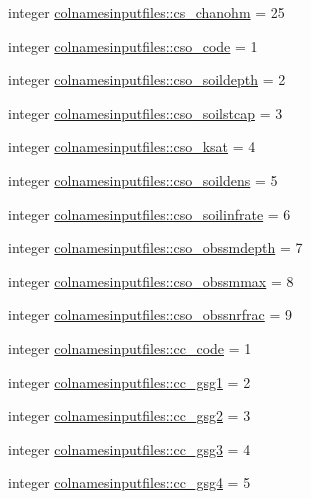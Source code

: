 \begin{DoxyCompactItemize}
\item 
integer \hyperlink{namespacecolnamesinputfiles_a002123e1a4d6e3102987980f56dacdd9}{colnamesinputfiles\+::cs\+\_\+chanohm} = 25
\item 
integer \hyperlink{namespacecolnamesinputfiles_a750911cb1a69d2d28f3b97ca1e8d40af}{colnamesinputfiles\+::cso\+\_\+code} = 1
\item 
integer \hyperlink{namespacecolnamesinputfiles_a8f92572bd1ed479f68b9c79308114583}{colnamesinputfiles\+::cso\+\_\+soildepth} = 2
\item 
integer \hyperlink{namespacecolnamesinputfiles_a762c09efd81c2a0789867996f250d528}{colnamesinputfiles\+::cso\+\_\+soilstcap} = 3
\item 
integer \hyperlink{namespacecolnamesinputfiles_abc296ff8b879ee72ed27a26ba0e2a402}{colnamesinputfiles\+::cso\+\_\+ksat} = 4
\item 
integer \hyperlink{namespacecolnamesinputfiles_aabee2fa19a7eb7a83e16ea233911bad0}{colnamesinputfiles\+::cso\+\_\+soildens} = 5
\item 
integer \hyperlink{namespacecolnamesinputfiles_a2223751db40afad6708ef049a89a74d0}{colnamesinputfiles\+::cso\+\_\+soilinfrate} = 6
\item 
integer \hyperlink{namespacecolnamesinputfiles_a5f5d0391da71a109ac38812b9cfcb09c}{colnamesinputfiles\+::cso\+\_\+obssmdepth} = 7
\item 
integer \hyperlink{namespacecolnamesinputfiles_a99244bb6c133e30d823031ec8c1f7067}{colnamesinputfiles\+::cso\+\_\+obssmmax} = 8
\item 
integer \hyperlink{namespacecolnamesinputfiles_ad5679a32c978e147737a5d21fa736281}{colnamesinputfiles\+::cso\+\_\+obssnrfrac} = 9
\item 
integer \hyperlink{namespacecolnamesinputfiles_a365c5f4e9d5796fd3c43ffc1886ecf74}{colnamesinputfiles\+::cc\+\_\+code} = 1
\item 
integer \hyperlink{namespacecolnamesinputfiles_a90e929109e7a8cd08df95f99f2561cd1}{colnamesinputfiles\+::cc\+\_\+gsg1} = 2
\item 
integer \hyperlink{namespacecolnamesinputfiles_a614110f82a823e6142965db6efb55168}{colnamesinputfiles\+::cc\+\_\+gsg2} = 3
\item 
integer \hyperlink{namespacecolnamesinputfiles_a1a8c73a721f0366e832c7786efdc3941}{colnamesinputfiles\+::cc\+\_\+gsg3} = 4
\item 
integer \hyperlink{namespacecolnamesinputfiles_ab4b1e0fe0864334d7bcb1e4b07c3107f}{colnamesinputfiles\+::cc\+\_\+gsg4} = 5
\item 

\end{DoxyCompactItemize}
